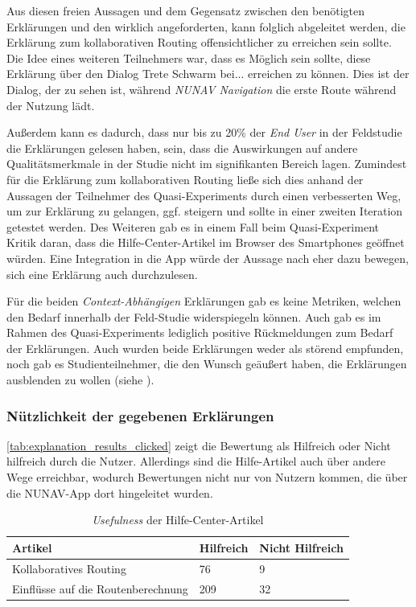 Aus diesen freien Aussagen und dem Gegensatz zwischen den benötigten Erklärungen und den wirklich angeforderten, kann folglich abgeleitet werden, die Erklärung zum kollaborativen Routing offensichtlicher zu erreichen sein sollte. Die Idee eines weiteren Teilnehmers war, dass es Möglich sein sollte, diese Erklärung über den Dialog \glqq Trete Schwarm bei...\grqq{} erreichen zu können. Dies ist der Dialog, der zu sehen ist, während \textit{NUNAV Navigation} die erste Route während der Nutzung lädt.

Außerdem kann es dadurch, dass nur bis zu 20\% der \textit{End User} in der Feldstudie die Erklärungen gelesen haben, sein, dass die Auswirkungen auf andere Qualitätsmerkmale in der Studie nicht im signifikanten Bereich lagen. Zumindest für die Erklärung zum kollaborativen Routing ließe sich dies anhand der Aussagen der Teilnehmer des Quasi-Experiments durch einen verbesserten Weg, um zur Erklärung zu gelangen, ggf. steigern und sollte in einer zweiten Iteration getestet werden. Des Weiteren gab es in einem Fall beim Quasi-Experiment Kritik daran, dass die Hilfe-Center-Artikel im Browser des Smartphones geöffnet würden. Eine Integration in die App würde der Aussage nach eher dazu bewegen, sich eine Erklärung auch durchzulesen.

Für die beiden \textit{Context-Abhängigen} Erklärungen gab es keine Metriken, welchen den Bedarf innerhalb der Feld-Studie widerspiegeln können. Auch gab es im Rahmen des Quasi-Experiments lediglich positive Rückmeldungen zum Bedarf der Erklärungen. Auch wurden beide Erklärungen weder als störend empfunden, noch gab es Studienteilnehmer, die den Wunsch geäußert haben, die Erklärungen ausblenden zu wollen (siehe ).

\subsubsection{Nützlichkeit der gegebenen Erklärungen}

\autoref{tab:explanation_results_clicked} zeigt die Bewertung als \glqq Hilfreich\grqq{} oder \glqq Nicht hilfreich\grqq{} durch die Nutzer. Allerdings sind die Hilfe-Artikel auch über andere Wege erreichbar, wodurch Bewertungen nicht nur von Nutzern kommen, die über die NUNAV-App dort hingeleitet wurden.

\begin{table}[htb!]
    \centering
    \begin{tabular}{p{}p{}p{}}
        \hline
        Artikel & Hilfreich & Nicht Hilfreich \\
        \toprule
        Kollaboratives Routing & 76 & 9 \\
        Einflüsse auf die Routenberechnung & 209 & 32 \\
        \bottomrule
    \end{tabular}
    \caption{\textit{Usefulness} der Hilfe-Center-Artikel}
    \label{tab:explanation_results_clicked}
\end{table}

